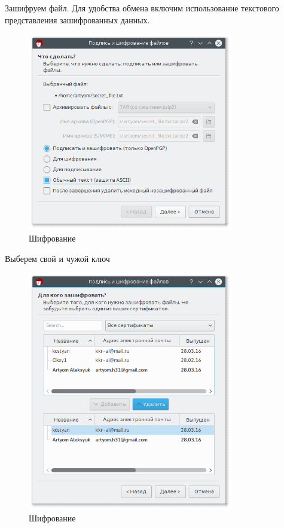 Зашифруем файл. Для удобства обмена включим использование текстового представления зашифрованных данных.

\begin{figure}[H]
	\centering
	\includegraphics[width=0.8\textwidth]{figures/screen18.png}
	\caption{Шифрование}
\end{figure}

Выберем свой и чужой ключ

\begin{figure}[H]
	\centering
	\includegraphics[width=0.8\textwidth]{figures/screen19.png}
	\caption{Шифрование}
\end{figure}

